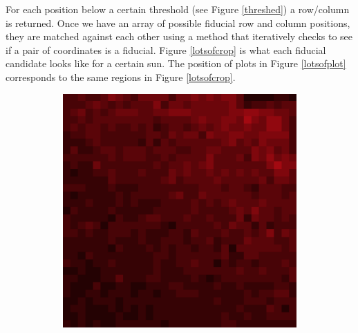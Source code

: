 \documentclass[10pt]{scrartcl}
\begin{document}
For each position below a certain threshold (see Figure \ref{threshed}) a row/column  is returned. Once we have an array of possible fiducial row and column positions, they are matched against each other using a method that iteratively checks to see if a pair of coordinates is a fiducial. Figure \ref{lotsofcrop} is what each fiducial candidate looks like for a certain sun. The position of plots in Figure \ref{lotsofplot} corresponds to the same regions in Figure \ref{lotsofcrop}. 

\begin{figure}[!ht]
    \vspace{-0.5in}
    \begin{subfigure}[b]{.3\linewidth}
        \centering
        \includegraphics[width=1.2\linewidth]{../plots_tables_images/1d1dcrop_0_0.eps}
    \end{subfigure}
    \begin{subfigure}[b]{.3\linewidth}
        \centering

\end{subfigure}
\end{figure}
\end{document}
